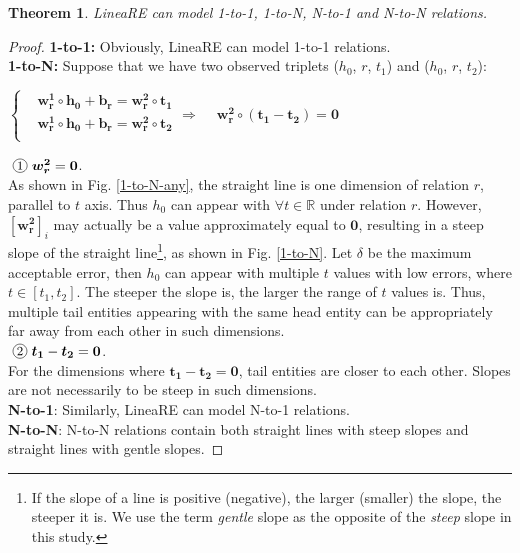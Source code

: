 \documentclass[conference]{IEEEtran}
\newtheorem{theorem}{Theorem}
\newcommand*{\circled}[1]{\lower.7ex\hbox{\tikz\draw (0pt, 0pt)circle (.5em) node {\makebox[1em][c]{\small #1}};}}
\begin{document}
\begin{theorem}
	LineaRE can model 1-to-1, 1-to-N, N-to-1 and N-to-N relations.
\end{theorem}
\begin{proof}
	\textbf{1-to-1:} Obviously, LineaRE can model 1-to-1 relations. \\
	\textbf{1-to-N:} Suppose that we have two observed triplets ($h_0$, $r$, $t_1$) and ($h_0$, $r$, $t_2$):
	\begin{flushleft}
		$
		\left\{
		\begin{aligned}
		&\bm{w_r^{1}} \circ \bm{h_0} + \bm{b_r} = \bm{w_r^{2}} \circ \bm{t_1}  \\
		&\bm{w_r^{1}} \circ \bm{h_0} + \bm{b_r} = \bm{w_r^{2}} \circ \bm{t_2}  \\
		\end{aligned}
		\right.
		\Rightarrow
		\begin{aligned}
		&\bm{w_{r}^{2}}\circ(\bm{t_1}-\bm{t_2}) = \bm{0}
		\end{aligned}
		$
	\end{flushleft}
	$\circled{1} \bm{w_{r}^{2}} = \bm{0}$. \\
	As shown in Fig. \ref{1-to-N-any}, the straight line is one dimension of relation $r$, parallel to $t$ axis. Thus $h_0$ can appear with $\forall t \in \mathbb{R}$ under relation $r$.
	However, $[\bm{w_r^2}]_i$ may actually be a value approximately equal to $\bm{0}$, resulting in a steep slope of the straight line\footnote{If the slope of a line is positive (negative), the larger (smaller) the slope, the steeper it is. We use the term \textit{gentle} slope as the opposite of the \textit{steep} slope in this study.}, as shown in Fig. \ref{1-to-N}.
	Let $\delta$ be the maximum acceptable error, then $h_0$ can appear with multiple $t$ values with low errors, where $t \in [t_1, t_2]$. The steeper the slope is, the larger the range of $t$ values is. Thus, multiple tail entities appearing with the same head entity can be appropriately far away from each other in such dimensions. \\
	$\circled{2} \bm{t_1}-\bm{t_2} = \bm{0}$. \\
	For the dimensions where $\bm{t_1}-\bm{t_2}=\bm{0}$, tail entities are closer to each other. Slopes are not necessarily to be steep in such dimensions. \\
	\textbf{N-to-1}: Similarly, LineaRE can model N-to-1 relations. \\
	\textbf{N-to-N}: N-to-N relations contain both straight lines with steep slopes and straight lines with gentle slopes.
\end{proof}
\end{document}
